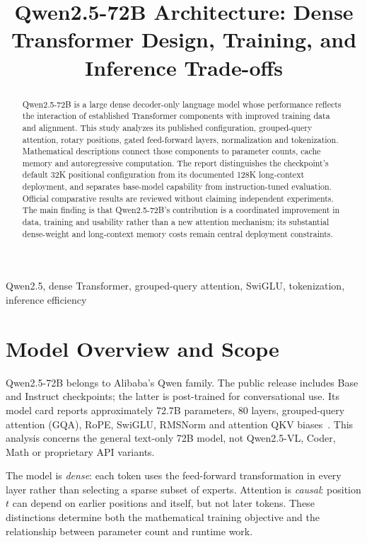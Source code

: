 \documentclass[conference]{IEEEtran}
\title{Qwen2.5-72B Architecture: Dense Transformer Design, Training, and Inference Trade-offs}
\author{\IEEEauthorblockN{Alaa Boghdady}\IEEEauthorblockA{Cellula AI Internship -- Week 8, Task 1}}
\begin{document}
\maketitle
\begin{abstract}
Qwen2.5-72B is a large dense decoder-only language model whose performance reflects the interaction of established Transformer components with improved training data and alignment. This study analyzes its published configuration, grouped-query attention, rotary positions, gated feed-forward layers, normalization and tokenization. Mathematical descriptions connect those components to parameter counts, cache memory and autoregressive computation. The report distinguishes the checkpoint's default 32K positional configuration from its documented 128K long-context deployment, and separates base-model capability from instruction-tuned evaluation. Official comparative results are reviewed without claiming independent experiments. The main finding is that Qwen2.5-72B's contribution is a coordinated improvement in data, training and usability rather than a new attention mechanism; its substantial dense-weight and long-context memory costs remain central deployment constraints.
\end{abstract}
\begin{IEEEkeywords}
Qwen2.5, dense Transformer, grouped-query attention, SwiGLU, tokenization, inference efficiency
\end{IEEEkeywords}

\section{Model Overview and Scope}
Qwen2.5-72B belongs to Alibaba's Qwen family. The public release includes Base and Instruct checkpoints; the latter is post-trained for conversational use. Its model card reports approximately 72.7B parameters, 80 layers, grouped-query attention (GQA), RoPE, SwiGLU, RMSNorm and attention QKV biases~\cite{card}. This analysis concerns the general text-only 72B model, not Qwen2.5-VL, Coder, Math or proprietary API variants.

The model is \emph{dense}: each token uses the feed-forward transformation in every layer rather than selecting a sparse subset of experts. Attention is \emph{causal}: position $t$ can depend on earlier positions and itself, but not later tokens. These distinctions determine both the mathematical training objective and the relationship between parameter count and runtime work.
\end{document}
